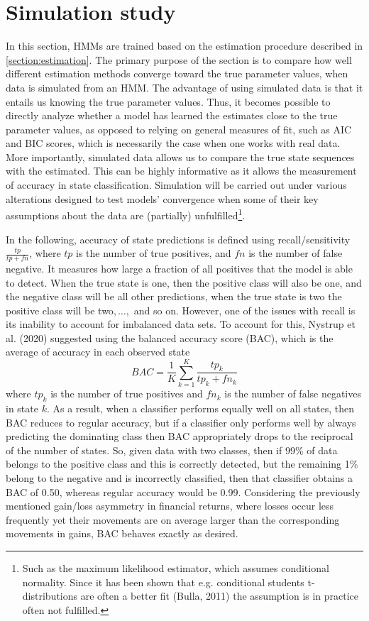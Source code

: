 \newpage

\section{Simulation study}
In this section, HMMs are trained based on the estimation procedure described in \cref{section:estimation}. The primary purpose of the section is to compare how well different estimation methods converge toward the true parameter values, when data is simulated from an HMM. The advantage of using simulated data is that it entails us knowing the true parameter values. Thus, it becomes possible to directly analyze whether a model has learned the estimates close to the true parameter values, as opposed to relying on general measures of fit, such as AIC and BIC scores, which is necessarily the case when one works with real data. More importantly, simulated data allows us to compare the true state sequences with the estimated. This can be highly informative as it allows the measurement of accuracy in state classification. Simulation will be carried out under various alterations designed to test models' convergence when some of their key assumptions about the data are (partially) unfulfilled\footnote
{Such as the maximum likelihood estimator, which assumes conditional normality. Since it has been shown that e.g. conditional students t-distributions are often a better fit (Bulla, 2011) the assumption is in practice often not fulfilled.
}.

In the following, accuracy of state predictions is defined using recall/sensitivity $\frac{tp}{tp+fn}$, where $tp$ is the number of true positives, and $fn$ is the number of false negative. It measures how large a fraction of all positives that the model is able to detect. When the true state is one, then the positive class will also be one, and the negative class will be all other predictions, when the true state is two the positive class will be two$,\ldots,$ and so on. However, one of the issues with recall is its inability to account for imbalanced data sets. To account for this, Nystrup et al. (2020) suggested using the balanced accuracy score (BAC), which is the average of accuracy in each observed state
\begin{equation}
    BAC = \frac{1}{K} \sum_{k=1}^K \frac{tp_k}{tp_k + fn_k}
\end{equation}
where $tp_k$ is the number of true positives and $fn_k$ is the number of false negatives in state $k$. As a result, when a classifier performs equally well on all states, then BAC reduces to regular accuracy, but if a classifier only performs well by always predicting the dominating class then BAC appropriately drops to the reciprocal of the number of states. So, given data with two classes, then if 99\% of data belongs to the positive class and this is correctly detected, but the remaining 1\% belong to the negative and is incorrectly classified, then that classifier obtains a BAC of 0.50, whereas regular accuracy would be 0.99. Considering the previously mentioned gain/loss asymmetry in financial returns, where losses occur less frequently yet their movements are on average larger than the corresponding movements in gains, BAC behaves exactly as desired.

